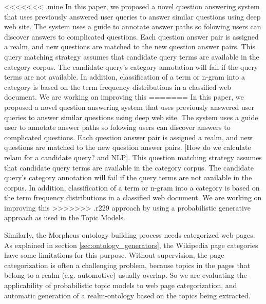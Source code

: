<<<<<<< .mine
In this paper, we proposed a novel question answering system that uses previously 
answered user queries to answer similar questions using deep web site.  
The system uses a guide to annotate answer paths so folowing users 
can discover answers to complicated questions.  Each question answer pair is 
assigned a realm, and new questions are matched to the new question answer pairs. 
This query matching strategy assumes that candidate query terms are
available in the category corpus. The candidate query's category annotation will
fail if the query terms are not available. In addition, classification of a
term or n-gram into a category is based on the term frequency distributions in a
classified web document. We are working on improving this
=======
In this paper, we proposed a novel question answering system that uses previously answered user queries to answer similar questions using deep web site.  The system uses a guide user to annotate answer paths so folowing users can discover answers to complicated questions.  Each question answer pair is assigned a realm, and new questions are matched to the new question answer pairs. [How do we calculate relam for a candidate query? and NLP]. This question matching strategy assumes that candidate query terms are available in the category corpus. The candidate query's category annotation will fail if the
query terms are not available in the corpus. In addition, classification of a term or n-gram into a category is based on the term frequency distributions in a classified web document. We are working on improving this
>>>>>>> .r229
approach by using a probabilistic generative approach as used in the Topic
Models\cite{Blei2003latentdirichlet}. 


Similarly, the Morpheus ontology building
process needs categorized web pages. As explained in section
\ref{sec:ontology_generators}, the Wikipedia page categories have some
limitations for this purpose. Without supervision, the page categorization is
often a challenging problem, because topics in the pages that belong to a realm
(e.g. automotive) usually overlap. So we are evaluating the applicability of
probabilistic topic models to web page categorization, and automatic
generation of a realm-ontology based on the topics being extracted.            
 


